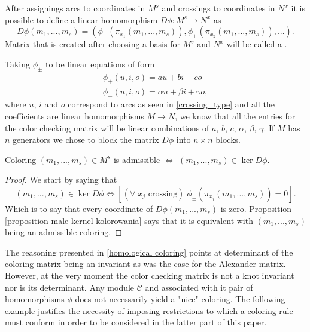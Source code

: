 \begin{definition}\label{def:color checking matrix}
  After assignings arcs to coordinates in $M^s$ and crossings to coordinates in $N^x$ it is possible to define a linear homomorphism $D\phi:M^s\to N^x$  as
  $$D\phi(m_1,...,m_s)=(\phi_\pm(\pi_{x_1}(m_1,...,m_s)), \phi_\pm(\pi_{x_2}(m_1,...,m_s)),...).$$
  Matrix that is created after choosing a basis for $M^s$ and $N^x$ will be called a .
\end{definition}

Taking $\phi_\pm$ to be linear equations of form
\begin{align}\label{phi equations1}
\phi_+(u,i,o)=au+bi+co \\ 
\phi_-(u,i,o)=\alpha u+\beta i+\gamma o, \label{phi equations2}
\end{align}
where $u$, $i$ and $o$ correspond to arcs as seen in \cref{crossing_type} and all the coefficients are linear homomorphisms $M\to N$, we know that all the entries for the color checking matrix will be linear combinations of $a$, $b$, $c$, $\alpha$, $\beta$, $\gamma$. If $M$ has $n$ generators we chose to block the matrix $D\phi$ into $n\times n$ blocks.

\begin{proposition}
  Coloring $(m_1,...,m_s)\in M^s$ is admissible $\iff$ $(m_1,...,m_s)\in\ker D\phi$.
\end{proposition}

\begin{proof}\color{blue}
  We start by saying that 
  $$(m_1,..., m_s)\in\ker D\phi\iff [(\forall\;x_j\text{ crossing})\;\phi_\pm(\pi_{x_j}(m_1,..., m_s))=0].$$
  Which is to say that every coordinate of $D\phi(m_1,..., m_s)$ is zero. Proposition \cref{proposition male kernel kolorowania} says that it is equivalent with $(m_1,..., m_s)$ being an admissible coloring.
\end{proof}

The reasoning presented in \cref{homological coloring} points at determinant of the coloring matrix being an invariant as was the case for the Alexander matrix. However, at the very moment the color checking matrix is not a knot invariant nor is its determinant. Any module $\mathcal{C}$ and associated with it pair of homomorphisms $\phi$ does not necessarily yield a "nice" coloring. The following example justifies the necessity of imposing restrictions to which a coloring rule must conform in order to be considered in the latter part of this paper.


